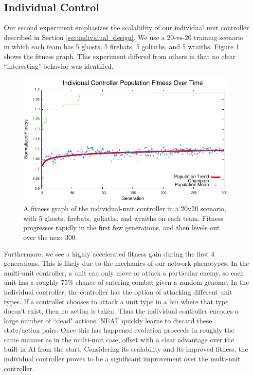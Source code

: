 \documentclass[10pt,a4paper,twocolumn]{article}
\begin{document}
\subsection{Individual Control}

Our second experiment emphasizes the scalability of our individual unit controller described in Section \ref{sec:individual_design}. We use a 20-vs-20 training scenario in which each team has 5 ghosts, 5 firebats, 5 goliaths, and 5 wraiths. Figure \ref{fig:individual_exp} shows the fitness graph. This experiment differed from others in that no clear ``interesting" behavior was identified.

\begin{figure}
\centering
\includegraphics[scale=.59]{plots/individual.pdf}
\caption{A fitness graph of the individual-unit controller in a 20v20 scenario, with 5 ghosts, firebats, goliaths, and wraiths on each team. Fitness progresses rapidly in the first few generations, and then levels out over the next 300.}
\label{fig:individual_exp}
\end{figure}

Furthermore, we see a highly accelerated fitness gain during the first 4 generations. This is likely due to the mechanics of our network phenotypes. In the multi-unit controller, a unit can only move or attack a particular enemy, so each unit has a roughly 75\% chance of entering combat given a random genome. In the individual controller, the controller has the option of attacking different unit types. If a controller chooses to attack a unit type in a bin where that type doesn't exist, then no action is taken. Thus the individual controller encodes a large number of ``dead" actions. NEAT quickly learns to discard these state/action pairs. Once this has happened evolution proceeds in roughly the same manner as in the multi-unit case, offset with a clear advantage over the built-in AI from the start. Considering its scalability and its improved fitness, the individual controller proves to be a significant improvement over the multi-unit controller.
\end{document}
